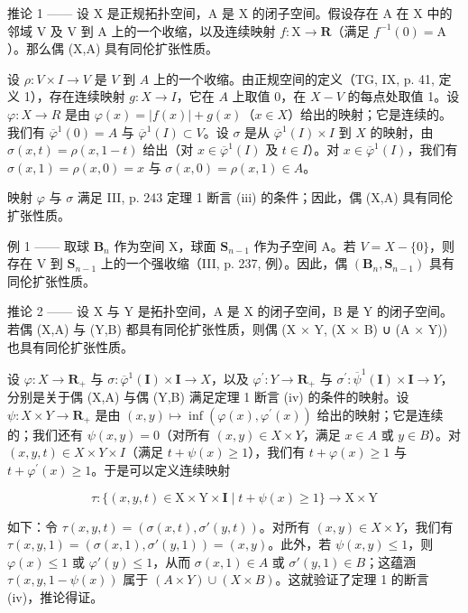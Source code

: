 推论 1 —— 设 X 是正规拓扑空间，A 是 X 的闭子空间。假设存在 A 在 X 中的邻域 V 及 V 到 A 上的一个收缩，以及连续映射 \(f: \mathrm{X} \to \mathbf{R}\)（满足 \(f^{-1}(0) = \mathrm{A}\)）。那么偶 (X,A) 具有同伦扩张性质。

设 \(\rho\colon V \times I \to V\) 是 \(V\) 到 \(A\) 上的一个收缩。由正规空间的定义（TG, IX, p. 41, 定义 1），存在连续映射 \(g\colon X \to I\)，它在 \(A\) 上取值 0，在 \(X - V\) 的每点处取值 1。设 \(\varphi\colon X \to R\) 是由 \(\varphi(x) = |f(x)| + g(x)\)（\(x \in X\)）给出的映射；它是连续的。我们有 \(\overline{\varphi}^{1}(0) = A\) 与 \(\overline{\varphi}^{1}(I) \subset V\)。设 \(\sigma\) 是从 \(\overline{\varphi}^{1}(I) \times I\) 到 \(X\) 的映射，由 \(\sigma(x,t) = \rho(x,1-t)\) 给出（对 \(x \in \overline{\varphi}^{1}(I)\) 及 \(t \in I\)）。对 \(x \in \overline{\varphi}^{1}(I)\)，我们有 \(\sigma(x,1) = \rho(x,0) = x\) 与 \(\sigma(x,0) = \rho(x,1) \in A\)。

映射 \(\varphi\) 与 \(\sigma\) 满足 III, p. 243 定理 1 断言 (iii) 的条件；因此，偶 (X,A) 具有同伦扩张性质。

例 1 —— 取球 \(\mathbf{B}_{n}\) 作为空间 X，球面 \(\mathbf{S}_{n-1}\) 作为子空间 A。若 \(V = X - \{0\}\)，则存在 V 到 \(\mathbf{S}_{n-1}\) 上的一个强收缩（III, p. 237, 例）。因此，偶 \((\mathbf{B}_{n}, \mathbf{S}_{n-1})\) 具有同伦扩张性质。

推论 2 —— 设 X 与 Y 是拓扑空间，A 是 X 的闭子空间，B 是 Y 的闭子空间。若偶 (X,A) 与 (Y,B) 都具有同伦扩张性质，则偶 (X × Y, (X × B) ∪ (A × Y)) 也具有同伦扩张性质。

设 \(\varphi\colon X\to\mathbf{R}_{+}\) 与 \(\sigma\colon\overline{\varphi}^{1}(\mathbf{I})\times\mathbf{I}\to X\)，以及 \(\varphi^{\prime}\colon Y\to\mathbf{R}_{+}\) 与 \(\sigma^{\prime}\colon\overline{\psi}^{1}(\mathbf{I})\times\mathbf{I}\to Y\)，分别是关于偶 (X,A) 与偶 (Y,B) 满足定理 1 断言 (iv) 的条件的映射。设 \(\psi\colon X\times Y\to\mathbf{R}_{+}\) 是由 \((x,y)\mapsto\inf(\varphi(x),\varphi^{\prime}(x))\) 给出的映射；它是连续的；我们还有 \(\psi(x,y)=0\)（对所有 \((x,y)\in X\times Y\)，满足 \(x\in A\) 或 \(y\in B\)）。对 \((x,y,t)\in X\times Y\times I\)（满足 \(t+\psi(x)\geqslant1\)），我们有 \(t+\varphi(x)\geqslant1\) 与 \(t+\varphi^{\prime}(x)\geqslant1\)。于是可以定义连续映射

\[
\tau \colon \{(x, y, t) \in \mathrm{X} \times \mathrm{Y} \times \mathbf {I} \mid t + \psi (x) \geqslant 1 \} \rightarrow \mathrm{X} \times \mathrm{Y}
\]

如下：令 \(\tau(x,y,t) = (\sigma(x,t),\sigma'(y,t))\)。对所有 \((x,y)\in X\times Y\)，我们有 \(\tau(x,y,1) = (\sigma(x,1),\sigma'(y,1)) = (x,y)\)。此外，若 \(\psi(x,y)\leqslant 1\)，则 \(\varphi(x)\leqslant 1\) 或 \(\varphi'(y)\leqslant 1\)，从而 \(\sigma(x,1)\in A\) 或 \(\sigma'(y,1)\in B\)；这蕴涵 \(\tau(x,y,1 - \psi(x))\) 属于 \((A\times Y)\cup (X\times B)\)。这就验证了定理 1 的断言 (iv)，推论得证。

